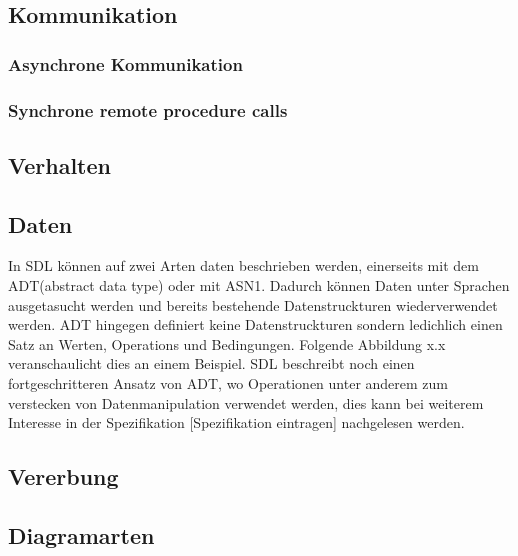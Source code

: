 \subsection{Kommunikation}
\label{ssc:Kommunikation}
\subsubsection{Asynchrone Kommunikation}
\label{sssc:AKommunikation}
\subsubsection{Synchrone remote procedure calls}
\label{sssc:KommunikationRPC}
\subsection{Verhalten}
\label{ssc:Verhalten}
\subsection{Daten}
\label{ssc:Daten}
In SDL können auf zwei Arten daten beschrieben werden, einerseits mit dem \ac{ADT}(abstract data 
type) oder mit \ac{ASN1}. Dadurch können Daten unter Sprachen ausgetasucht werden und bereits 
bestehende Datenstruckturen wiederverwendet werden. \ac{ADT} hingegen definiert keine 
Datenstruckturen sondern ledichlich einen Satz an Werten, Operations und Bedingungen. Folgende 
Abbildung x.x veranschaulicht dies an einem Beispiel. \ac{SDL} beschreibt noch einen 
fortgeschritteren Ansatz von \ac{ADT}, wo Operationen unter anderem zum verstecken von 
Datenmanipulation verwendet werden, dies kann bei weiterem Interesse in der Spezifikation 
[Spezifikation eintragen] nachgelesen werden.    
\subsection{Vererbung} 
\label{ssc:Vererbung}


\subsection{Diagramarten}
\label{ssc:Diagramarten}
